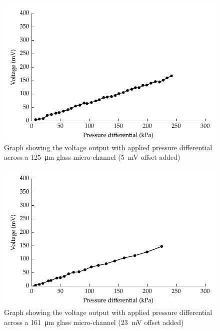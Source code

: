       \begin{figure}
          \centering
          \includegraphics{content/pt1/01-PowerHarvesting/graphics/streamingCell_voltVsPress_125um_out}
          \caption{\label{fig:VvsP_125um}Graph showing the voltage output with applied pressure differential across a \SI{125}{\micro\metre} glass micro-channel (\SI{5}{\milli\volt} offset added)}
      \end{figure}

      \begin{figure}
          \centering
          \includegraphics{content/pt1/01-PowerHarvesting/graphics/streamingCell_voltVsPress_161um_out}
          \caption{\label{fig:VvsP_161um}Graph showing the voltage output with applied pressure differential across a \SI{161}{\micro\metre} glass micro-channel (\SI{23}{\milli\volt} offset added)}
      \end{figure}

